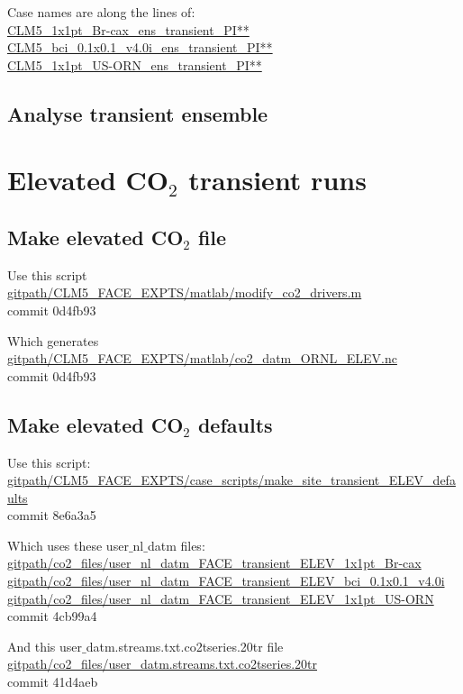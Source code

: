 \documentclass{article}
\begin{document}
Case names are along the lines of:\\
{\color{cyan}\small{\url{CLM5_1x1pt_Br-cax_ens_transient_PI**}}}\\
{\color{cyan}\small{\url{CLM5_bci_0.1x0.1_v4.0i_ens_transient_PI**}}}\\
{\color{cyan}\small{\url{CLM5_1x1pt_US-ORN_ens_transient_PI**}}}

\subsection{Analyse transient ensemble}

\section{Elevated CO$_{2}$ transient runs}
\subsection{Make elevated CO$_{2}$ file}
Use this script\\
{\color{blue}\small{\url{gitpath/CLM5_FACE_EXPTS/matlab/modify_co2_drivers.m}}}\\
commit 0d4fb93

Which generates\\
{\color{red}\small{\url{gitpath/CLM5_FACE_EXPTS/matlab/co2_datm_ORNL_ELEV.nc}}}\\
commit 0d4fb93  

\subsection{Make elevated CO$_{2}$ defaults}
Use this script:\\
{\color{blue}\small{\url{gitpath/CLM5_FACE_EXPTS/case_scripts/make_site_transient_ELEV_defaults}}}\\
commit 8e6a3a5    


Which uses these user$\_$nl$\_$datm files:\\
{\color{blue}\small{\url{gitpath/co2_files/user_nl_datm_FACE_transient_ELEV_1x1pt_Br-cax}}}\\
{\color{blue}\small{\url{gitpath/co2_files/user_nl_datm_FACE_transient_ELEV_bci_0.1x0.1_v4.0i}}}\\
{\color{blue}\small{\url{gitpath/co2_files/user_nl_datm_FACE_transient_ELEV_1x1pt_US-ORN}}}\\
commit 4cb99a4

And this user$\_$datm.streams.txt.co2tseries.20tr file\\
{\color{blue}\small{\url{gitpath/co2_files/user_datm.streams.txt.co2tseries.20tr}}}\\
commit 41d4aeb  
\end{document}
